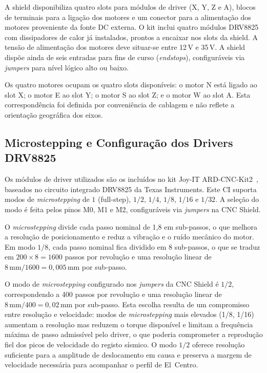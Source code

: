 A shield disponibiliza quatro slots para módulos de driver (X, Y, Z e A), blocos de terminais para a ligação dos motores e um conector para a alimentação dos motores proveniente da fonte DC externa. O kit inclui quatro módulos DRV8825 com dissipadores de calor já instalados, prontos a encaixar nos slots da shield. A tensão de alimentação dos motores deve situar-se entre 12\,V e 35\,V. A shield dispõe ainda de seis entradas para fins de curso (\textit{endstops}), configuráveis via \textit{jumpers} para nível lógico alto ou baixo.

Os quatro motores ocupam os quatro slots disponíveis: o motor N está ligado ao slot X; o motor E ao slot Y; o motor S ao slot Z; e o motor W ao slot A. Esta correspondência foi definida por conveniência de cablagem e não reflete a orientação geográfica dos eixos.


\subsection{Microstepping e Configuração dos Drivers DRV8825}
\label{subsec:microstepping}

Os módulos de driver utilizados são os incluídos no kit Joy-IT ARD-CNC-Kit2~\cite{JoyITCNCKit2}, baseados no circuito integrado DRV8825 da Texas Instruments. Este CI suporta modos de \textit{microstepping} de $1$ (full-step), $1/2$, $1/4$, $1/8$, $1/16$ e $1/32$. A seleção do modo é feita pelos pinos M0, M1 e M2, configuráveis via \textit{jumpers} na CNC Shield.

O \textit{microstepping} divide cada passo nominal de 1{,}8\textdegree{} em sub-passos, o que melhora a resolução de posicionamento e reduz a vibração e o ruído mecânico do motor. Em modo $1/8$, cada passo nominal fica dividido em 8 sub-passos, o que se traduz em $200 \times 8 = 1600$ passos por revolução e uma resolução linear de $8\,\text{mm} / 1600 = 0{,}005\,\text{mm}$ por sub-passo.

O modo de \textit{microstepping} configurado nos \textit{jumpers} da CNC Shield é $1/2$, correspondendo a 400 passos por revolução e uma resolução linear de $8\,\text{mm} / 400 = 0{,}02\,\text{mm}$ por sub-passo. Esta escolha resulta de um compromisso entre resolução e velocidade: modos de \textit{microstepping} mais elevados (1/8, 1/16) aumentam a resolução mas reduzem o torque disponível e limitam a frequência máxima de passo admissível pelo driver, o que poderia comprometer a reprodução fiel dos picos de velocidade do registo sísmico. O modo $1/2$ oferece resolução suficiente para a amplitude de deslocamento em causa e preserva a margem de velocidade necessária para acompanhar o perfil de El~Centro.

